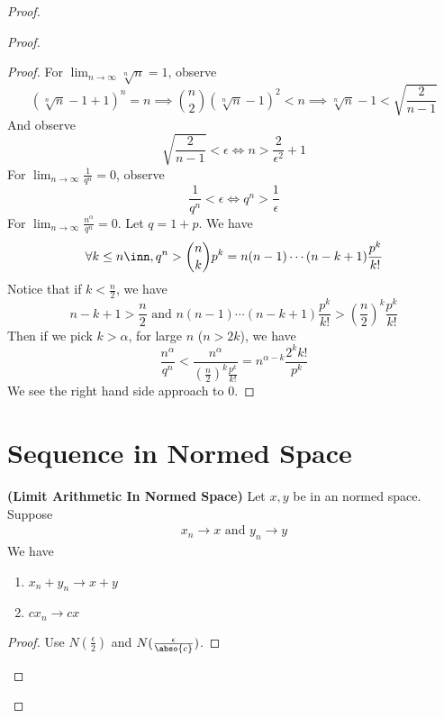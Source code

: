 \documentclass{report}
\begin{document}
\begin{proof}
\begin{proof}
\begin{proof}
For $\lim_{n\to\infty}\sqrt[n]{n} =1$, observe
\begin{equation}
 (\sqrt[n]{n}-1+1)^n=n\implies \binom{n}{2} (\sqrt[n]{n}-1)^2<n\implies \sqrt[n]{n}-1<\sqrt{\frac{2}{n-1}}  
\end{equation}
And observe
\begin{equation}
\sqrt{\frac{2}{n-1}}<\epsilon  \iff n>\frac{2}{\epsilon^2}+1  
\end{equation}
For $\lim_{n\to\infty}\frac{1}{q^n}=0$, observe
\begin{equation}
\frac{1}{q^n}<\epsilon  \iff  q^n>\frac{1}{\epsilon }
\end{equation}
For $\lim_{n\to\infty}\frac{n^\alpha }{q^n}=0$. Let $q=1+p$. We have
 \begin{equation}
\forall k\leq n\inn, q^n>\binom{n}{k}p^k=n(n-1)\cdots (n-k+1) \frac{p^k}{k!}
\end{equation}
Notice that if $k<\frac{n}{2}$, we have
 \begin{equation}
n-k+1>\frac{n}{2}\text{ and }n(n-1)\cdots (n-k+1) \frac{p^k}{k!}>(\frac{n}{2})^k \frac{p^k}{k!}
\end{equation}
Then if we pick $k>\alpha $, for large  $n$  ($n>2k$), we have 
\begin{equation}
\frac{n^{\alpha }}{q^n}<\frac{n^{\alpha }}{(\frac{n}{2})^k \frac{p^k}{k!}}=n^{\alpha -k}\frac{2^kk!}{p^k}
\end{equation}
We see the right hand side approach to $0$.
\end{proof}
\section{Sequence in Normed Space} 
\begin{theorem}
\label{4.2.1}
\textbf{(Limit Arithmetic In Normed Space)} Let $x,y$ be in an normed space. Suppose 
\begin{align*}
x_n \to x \text{ and }y_n \to y
\end{align*}
We have 
\begin{enumerate}[label=(\alph*)]
  \item $x_n+y_n \to x+y$ 
  \item  $cx_n \to cx$
\end{enumerate}
\end{theorem}
\begin{proof}
Use $N(\frac{\epsilon }{2})$ and $N(\frac{\epsilon }{\abso{c}})$. 
\end{proof}

\end{proof}
\end{proof}
\end{document}

